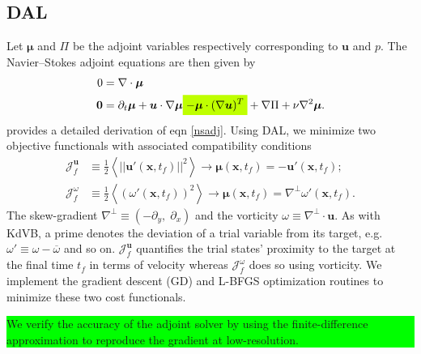 \documentclass[%
 reprint,
 amsmath,amssymb,
 aps,
 pre,
]{revtex4-2}
\newcommand{\hly}[1]{\colorbox{lime}{\parbox{\columnwidth}{#1}}}
\newcommand{\highlightmath}[1]{\colorbox{lime}{$\displaystyle #1$}}
\renewcommand{\vec}[1]{\boldsymbol{#1}}
\newcommand{\grad}{\nabla}
\newcommand{\JUf}{\mathcal{J}^{\vec{u}}_f}
\newcommand{\Jwf}{\mathcal{J}^{\omega}_f}
\begin{document}
\subsection{DAL}
\label{NSdal}
Let $\vec{\mu}$ and $\Pi$ be the adjoint variables respectively corresponding to $\vec{u}$ and $p$.
The Navier--Stokes adjoint equations are then given by
\begin{align}
  0 &= \grad\cdot\vec{\mu} \label{nsadj} \\
  \vec{0} &= \partial_t \vec{\mu} + \vec{u}\cdot\grad\vec{\mu} \highlightmath{- \vec{\mu}\cdot(\grad\vec{u})^T} + \grad\Pi + \nu\grad^2\vec{\mu}. \nonumber
\end{align}
\cite{Kerswell2014} provides a detailed derivation of eqn \ref{nsadj}.
Using DAL, we minimize two objective functionals with associated compatibility conditions
\begin{align}
  \JUf &\equiv \frac{1}{2}\left\langle|| \vec{u'}(\vec{x}, t_f)||^2\right\rangle   \rightarrow  \vec{\mu}(\vec{x}, t_f)=-\vec{u'}(\vec{x}, t_f); \\
  \Jwf &\equiv \frac{1}{2}\left\langle\left( \omega'(\vec{x}, t_f)\right)^2\right\rangle \rightarrow  \vec{\mu}(\vec{x}, t_f)=\grad^{\perp}\omega'(\vec{x}, t_f) \label{Jw}.
\end{align}
The skew-gradient $\grad^{\perp}\equiv (-\partial_y, \; \partial_x)$ and the vorticity $\omega \equiv \grad^{\perp}\cdot\vec{u}$. 
As with KdVB, a prime denotes the deviation of a trial variable from its target, e.g.~$\omega'\equiv\omega-\overline{\omega}$ and so on.
$\JUf$ quantifies the trial states' proximity to the target at the final time $t_f$ in terms of velocity whereas $\Jwf$ does so using vorticity.
We implement the gradient descent (GD) and L-BFGS optimization routines to minimize these two cost functionals.
\hly{We verify the accuracy of the adjoint solver by using the finite-difference approximation to reproduce the gradient at low-resolution.}
\end{document}
